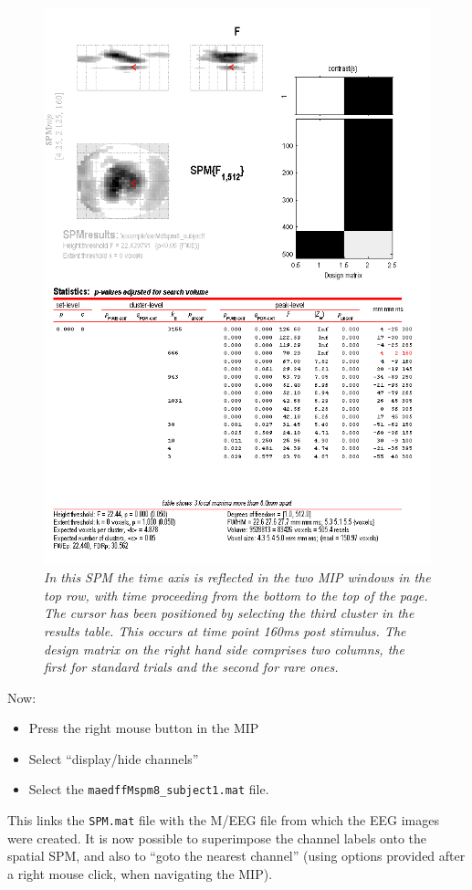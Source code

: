  \begin{figure}
\begin{center}
\includegraphics[width=120mm]{mmn/3DSPM}
\caption{\em In this SPM the time axis is reflected in the two MIP windows in the top row, with time proceeding from the bottom to the top of the page. The cursor has been positioned by selecting the third cluster in the results table. This occurs at time point 160ms post stimulus. The design matrix on the right hand side comprises two columns, the first for standard trials and the second for rare ones. \label{3DSPM}}
\end{center}
\end{figure}
Now:
\begin{itemize}
\item{Press the right mouse button in the MIP}
\item{Select ``display/hide channels''}
\item{Select the \texttt{maedffMspm8\_subject1.mat} file.}
\end{itemize}
This links the \texttt{SPM.mat} file with the M/EEG file from which the EEG images were created.
It is now possible to superimpose the channel labels onto the spatial SPM, and also to ``goto the nearest channel'' (using options provided after a right mouse click, when navigating the MIP).
 
